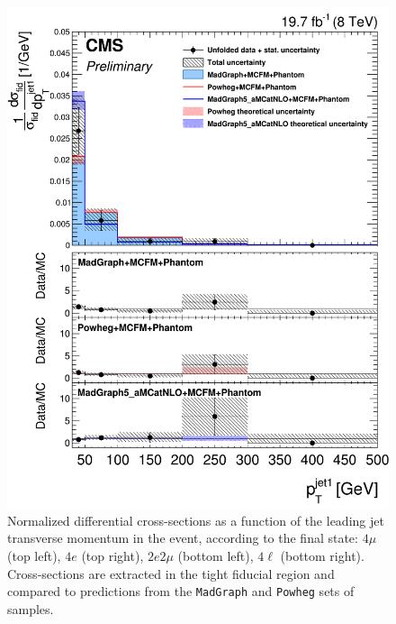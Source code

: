 \begin{figure}[hbtp]
\begin{center}
    \includegraphics[width=\cmsFigWidth]{Figures/DiffCrossSecZZTo4lPtJet1_Unfolded_fr_MadGraph_norm.png}       
    \caption{\footnotesize{Normalized differential cross-sections as a function of the leading jet transverse momentum in the event, according to the final state: $4\mu$ (top left), $4e$ (top right), $2e2\mu$  (bottom left),  $4\ell$ (bottom right). Cross-sections are extracted in the tight fiducial region and compared to predictions from the \texttt{MadGraph} and \texttt{Powheg} sets of samples.}}
    \label{fig:diff_xs_ptjet1}
  \end{center}
\end{figure}


